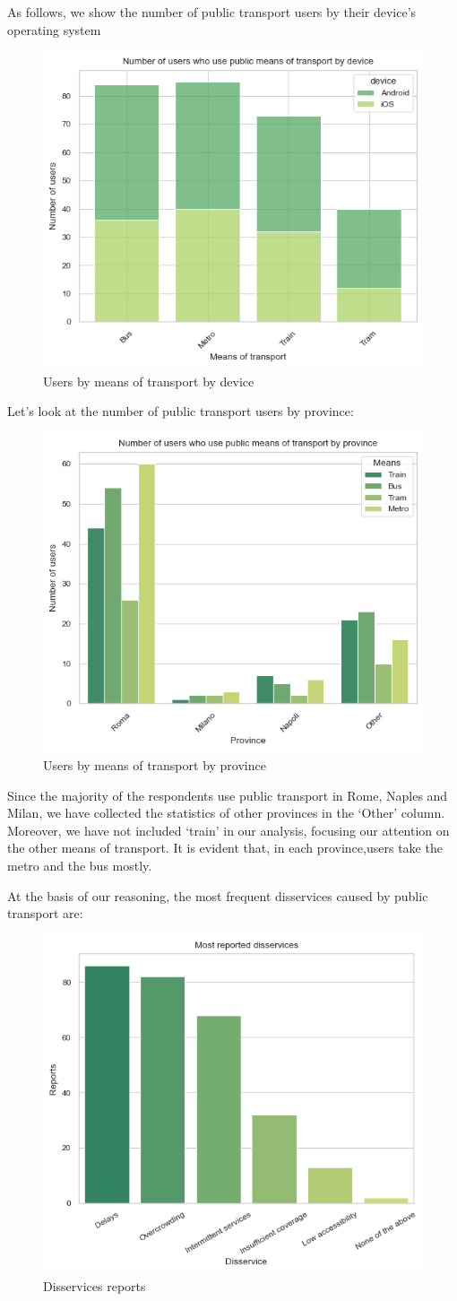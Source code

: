 \documentclass[a4paper, 11pt]{report}
\begin{document}
As follows, we show the number of public transport users by their device's operating system
\begin{figure}[H]
	\centering
	\includegraphics[width=.5\textwidth]{img/analysis/users_by_means_of_transport_by_device.png}
	\caption{Users by means of transport by device}
\end{figure}

Let's look at the number of public transport users by province:
\begin{figure}[H]
	\centering
	\includegraphics[width=.5\textwidth]{img/analysis/users_by_means_of_transport_by_province.png}
	\caption{Users by means of transport by province}
\end{figure}

Since the majority of the respondents use public transport in Rome, Naples and Milan, we have collected the statistics of other provinces in the `Other' column.
Moreover, we have not included `train' in our analysis, focusing our attention on the other means of transport.
It is evident that, in each province,users take the metro and the bus mostly.


At the basis of our reasoning, the most frequent disservices caused by public transport are:
\begin{figure}[H]
	\centering
	\includegraphics[width=.5\textwidth]{img/analysis/disservices_reports.png}
	\caption{Disservices reports}
\end{figure}
\end{document}
